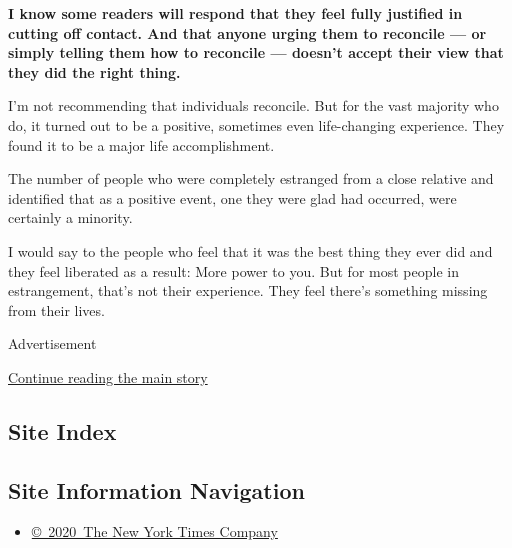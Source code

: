 \textbf{I know some readers will respond that they feel fully justified
in cutting off contact. And that anyone urging them to reconcile --- or
simply telling them how to reconcile --- doesn't accept their view that
they did the right thing.}

I'm not recommending that individuals reconcile. But for the vast
majority who do, it turned out to be a positive, sometimes even
life-changing experience. They found it to be a major life
accomplishment.

The number of people who were completely estranged from a close relative
and identified that as a positive event, one they were glad had
occurred, were certainly a minority.

I would say to the people who feel that it was the best thing they ever
did and they feel liberated as a result: More power to you. But for most
people in estrangement, that's not their experience. They feel there's
something missing from their lives.

Advertisement

\protect\hyperlink{after-bottom}{Continue reading the main story}

\hypertarget{site-index}{%
\subsection{Site Index}\label{site-index}}

\hypertarget{site-information-navigation}{%
\subsection{Site Information
Navigation}\label{site-information-navigation}}

\begin{itemize}
\tightlist
\item
  \href{https://help.nytimes3xbfgragh.onion/hc/en-us/articles/115014792127-Copyright-notice}{©~2020~The
  New York Times Company}
\end{itemize}

